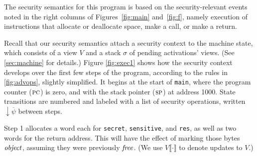 \documentclass[10pt,conference]{ieeetran}%
\theoremstyle{definition}
\begin{document}
The security semantics for this program is based
on the security-relevant events noted in the right columns of Figures~\ref{fig:main}
and~\ref{fig:f}, namely execution of instructions that allocate or deallocate space,
make a call, or make a return.

Recall that our security semantics attach a security context to the machine state,
which consists of a view \(V\) and a stack \(\sigma\) of pending activations' views.
(See \cref{sec:machine} for details.)
Figure \ref{fig:exec1} shows how the security context develops over the first few
steps of the program, according to the rules in \cref{fig:advops}, slightly simplified.
It begins at the start of {\tt main}, where the program counter (\(\textsc{pc}\)) is zero,
and with the stack pointer (\(\textsc{sp}\)) at address 1000.
State transitions are numbered and labeled with a list of security operations, written
\(\downarrow \overline{\psi}\) between steps.

Step 1 allocates a word each for {\tt secret}, {\tt sensitive}, and {\tt res}, as well
as two words for the return address. This will have the
effect of marking those bytes \(\mathit{object}\), assuming they were previously
\(\mathit{free}\). (We use \(V\llbracket\cdot\rrbracket\) to denote updates to \(V\).)
%

\newcommand{\freebox}{\tikz \filldraw[fill=blue] (0,0) rectangle (10px,10px);}
\newcommand{\pubbox}{\tikz \filldraw[fill=lightgray] (0,0) rectangle (10px,10px);}
\newcommand{\objbox}{\tikz \filldraw[fill=yellow] (0,0) rectangle (10px,10px);}
\newcommand{\sealbox}{\tikz \filldraw[fill=red] (0,0) rectangle (10px,10px);}
\end{document}
